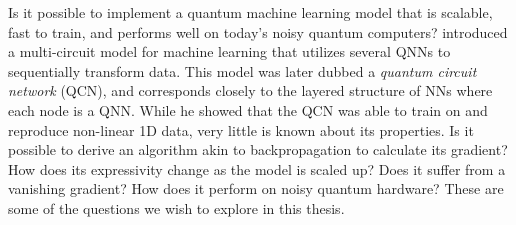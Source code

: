 Is it possible to implement a quantum machine learning model that is scalable, fast to train, and performs well on today's noisy quantum computers? \citet{stian} introduced a multi-circuit model for machine learning that utilizes several QNNs to sequentially transform data. This model was later dubbed a \emph{quantum circuit network} (QCN), and corresponds closely to the layered structure of NNs where each node is a QNN. While he showed that the QCN was able to train on and reproduce non-linear 1D data, very little is known about its properties. Is it possible to derive an algorithm akin to backpropagation to calculate its gradient? How does its expressivity change as the model is scaled up? Does it suffer from a vanishing gradient? How does it perform on noisy quantum hardware? These are some of the questions we wish to explore in this thesis.


